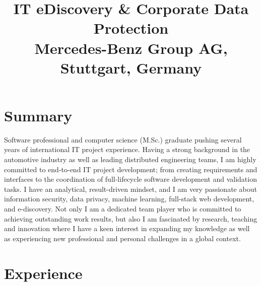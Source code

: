 \documentclass[11pt,a4paper,sans]{moderncv}        %
\title{\large IT eDiscovery \& Corporate Data Protection \\ Mercedes-Benz Group AG, Stuttgart, Germany}                               %
\begin{document}
\makecvtitle

\section{Summary}
Software professional and computer science (M.Sc.) graduate pushing several years of international IT
project experience. Having a strong background in the automotive industry as well as leading
distributed engineering teams, I am highly committed to end-to-end IT project development; \linebreak from
creating requirements and interfaces to the coordination of full-lifecycle software development and
validation tasks. I have an analytical, result-driven mindset, and I am very passionate about
information security, data privacy, machine learning, full-stack web development, and e-discovery. Not only I am a
dedicated team player who is committed to achieving outstanding work results, but also I am
fascinated by research, teaching and innovation where I have a keen interest in expanding my knowledge
as well as experiencing new professional and personal challenges in a global context.

\section{Experience}
\end{document}
